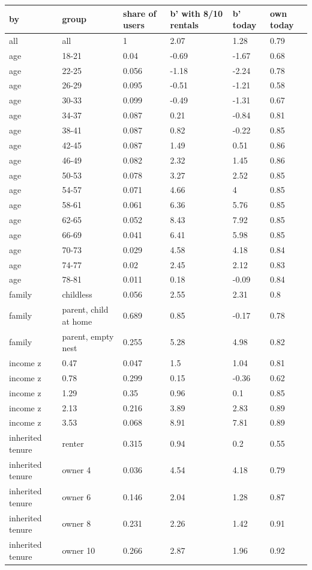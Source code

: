 \begingroup\small
\setlength{\tabcolsep}{3pt}
\renewcommand{\arraystretch}{1.04}
\begin{tabularx}{\linewidth}{XXXXXX}
\toprule
by & group & share of users & b' with 8/10 rentals & b' today & own today \\
\midrule
all & all & 1 & 2.07 & 1.28 & 0.79 \\
age & 18-21 & 0.04 & -0.69 & -1.67 & 0.68 \\
age & 22-25 & 0.056 & -1.18 & -2.24 & 0.78 \\
age & 26-29 & 0.095 & -0.51 & -1.21 & 0.58 \\
age & 30-33 & 0.099 & -0.49 & -1.31 & 0.67 \\
age & 34-37 & 0.087 & 0.21 & -0.84 & 0.81 \\
age & 38-41 & 0.087 & 0.82 & -0.22 & 0.85 \\
age & 42-45 & 0.087 & 1.49 & 0.51 & 0.86 \\
age & 46-49 & 0.082 & 2.32 & 1.45 & 0.86 \\
age & 50-53 & 0.078 & 3.27 & 2.52 & 0.85 \\
age & 54-57 & 0.071 & 4.66 & 4 & 0.85 \\
age & 58-61 & 0.061 & 6.36 & 5.76 & 0.85 \\
age & 62-65 & 0.052 & 8.43 & 7.92 & 0.85 \\
age & 66-69 & 0.041 & 6.41 & 5.98 & 0.85 \\
age & 70-73 & 0.029 & 4.58 & 4.18 & 0.84 \\
age & 74-77 & 0.02 & 2.45 & 2.12 & 0.83 \\
age & 78-81 & 0.011 & 0.18 & -0.09 & 0.84 \\
family & childless & 0.056 & 2.55 & 2.31 & 0.8 \\
family & parent, child at home & 0.689 & 0.85 & -0.17 & 0.78 \\
family & parent, empty nest & 0.255 & 5.28 & 4.98 & 0.82 \\
income z & 0.47 & 0.047 & 1.5 & 1.04 & 0.81 \\
income z & 0.78 & 0.299 & 0.15 & -0.36 & 0.62 \\
income z & 1.29 & 0.35 & 0.96 & 0.1 & 0.85 \\
income z & 2.13 & 0.216 & 3.89 & 2.83 & 0.89 \\
income z & 3.53 & 0.068 & 8.91 & 7.81 & 0.89 \\
inherited tenure & renter & 0.315 & 0.94 & 0.2 & 0.55 \\
inherited tenure & owner 4 & 0.036 & 4.54 & 4.18 & 0.79 \\
inherited tenure & owner 6 & 0.146 & 2.04 & 1.28 & 0.87 \\
inherited tenure & owner 8 & 0.231 & 2.26 & 1.42 & 0.91 \\
inherited tenure & owner 10 & 0.266 & 2.87 & 1.96 & 0.92 \\
\bottomrule
\end{tabularx}
\endgroup
